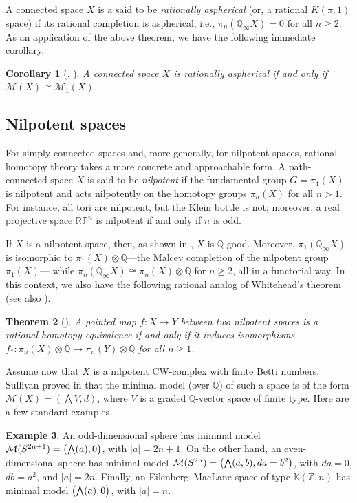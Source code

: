 \documentclass{article}
\numberwithin{equation}{section}
\newtheorem{theorem}{Theorem}[section]
\newtheorem{corollary}[theorem]{Corollary}
\theoremstyle{definition}
\newtheorem{example}[theorem]{Example}
\newcommand{\Z}{\mathbb{Z}}
\newcommand{\Q}{\mathbb{Q}}
\newcommand{\RP}{\mathbb{RP}}
\newcommand{\K}{\mathbb{K}}
\newcommand{\M}{\mathcal{M}}
\newcommand{\abs}[1]{\left| #1 \right|}
\newcommand{\bwedge}{\mbox{\normalsize $\bigwedge$}}
\begin{document}
A connected space $X$ is a said to be {\em rationally aspherical}\/ (or, a 
rational $K(\pi,1)$ space) if its rational completion is aspherical, i.e.,
$\pi_n(\Q_{\infty}X)=0$ for all $n\ge 2$. As an application 
of the above theorem, we have the following immediate corollary. 

\begin{corollary}[\cite{Falk}, \cite{PY99}]
\label{cor:nilp-bk-mm}
A connected space $X$ is rationally aspherical if and only if $\M(X)\cong \M_1(X)$.
\end{corollary}

\subsection{Nilpotent spaces}
\label{subsec:nilp-spaces}

For simply-connected spaces and, more generally, for nilpotent spaces, 
rational homotopy theory takes a more concrete and approachable form. 
A path-connected space $X$ is said to be {\em nilpotent}\/ if the fundamental group 
$G=\pi_1(X)$ is nilpotent and acts nilpotently on the homotopy groups 
$\pi_n (X)$ for all $n>1$. For instance, all tori are nilpotent, but the Klein bottle 
is not; moreover, a real projective space $\RP^{n}$ is nilpotent if and only if $n$ is odd.

If $X$ is a nilpotent space, then, as shown in \cite{BK72}, $X$ is $\Q$-good. 
Moreover, $\pi_1(\Q_{\infty}X)$ is isomorphic to $\pi_1(X)\otimes \Q$---the 
Malcev completion of the nilpotent group $\pi_1(X)$---%
while $\pi_n(\Q_{\infty}X)\cong \pi_n(X)\otimes \Q$ for $n\ge 2$, all in a functorial way. 
In this context, we also have the following rational analog of Whitehead's theorem 
(see also \cite{RWZ}). 

\begin{theorem}[\cite{BK72}]
\label{thm:wh-bk}
A pointed map $f\colon  X\to Y$ between two nilpotent spaces is a 
rational homotopy equivalence if and only if it induces isomorphisms 
$f_{*}\colon \pi_n(X)\otimes \Q \to \pi_n(Y)\otimes \Q$ for all $n\ge 1$.
\end{theorem}

Assume now that $X$ is a nilpotent CW-complex with finite Betti numbers. 
Sullivan proved in \cite{Sullivan77} that the minimal model (over $\Q$) 
of such a space is of the form 
$\M (X)= (\bigwedge V, d)$, where $V$ is a graded $\Q$-vector space 
of finite type.  Here are a few standard examples.

\begin{example}
\label{ex:models-nilp}
An odd-dimensional sphere has minimal model 
$\M(S^{2n+1})=\big(\bwedge (a) ,0\big)$, with $\abs{a}=2n+1$. 
On the other hand, an even-dimensional sphere has minimal model 
$\M(S^{2n})=\left(\bwedge (a,b) ,da=b^2\right)$, with $da=0$, $db=a^2$, 
and $\abs{a}=2n$.  Finally, an Eilenberg--MacLane space 
of type $\K(\Z,n)$ has minimal model $\big(\bwedge (a) ,0\big)$, 
with $\abs{a}=n$. 
\end{example}
\end{document}
